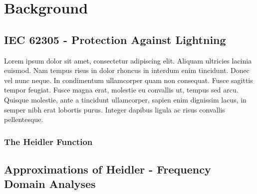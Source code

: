 
\chapter{Background} %

\label{ChapterBackground} %



\section{IEC 62305 - Protection Against Lightning}
\label{sec:bg_iec}

Lorem ipsum dolor sit amet, consectetur adipiscing elit. Aliquam ultricies lacinia euismod. Nam tempus risus in dolor rhoncus in interdum enim tincidunt. Donec vel nunc neque. In condimentum ullamcorper quam non consequat. Fusce sagittis tempor feugiat. Fusce magna erat, molestie eu convallis ut, tempus sed arcu. Quisque molestie, ante a tincidunt ullamcorper, sapien enim dignissim lacus, in semper nibh erat lobortis purus. Integer dapibus ligula ac risus convallis pellentesque.



\subsection{The Heidler Function}
\label{sec:bg_heidler}




\section{Approximations of Heidler - Frequency Domain Analyses}
\label{sec:bg_approx}

